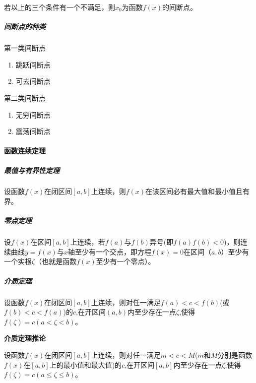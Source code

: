 \documentclass[
]{article}
\begin{document}
若以上的三个条件有一个不满足，则\(x_0\)为函数\(f(x)\)的间断点。

\hypertarget{ux95f4ux65adux70b9ux7684ux79cdux7c7b}{%
\subparagraph{间断点的种类}\label{ux95f4ux65adux70b9ux7684ux79cdux7c7b}}

第一类间断点

\begin{enumerate}
\def\labelenumi{\arabic{enumi}.}
\item
  跳跃间断点
\item
  可去间断点
\end{enumerate}

第二类间断点

\begin{enumerate}
\def\labelenumi{\arabic{enumi}.}
\item
  无穷间断点
\item
  震荡间断点
\end{enumerate}

\hypertarget{ux51fdux6570ux8fdeux7eedux5b9aux7406}{%
\paragraph{函数连续定理}\label{ux51fdux6570ux8fdeux7eedux5b9aux7406}}

\hypertarget{ux6700ux503cux4e0eux6709ux754cux6027ux5b9aux7406}{%
\subparagraph{最值与有界性定理}\label{ux6700ux503cux4e0eux6709ux754cux6027ux5b9aux7406}}

设函数\(f(x)\)在闭区间\([a,b]\)上连续，则\(f(x)\)在该区间必有最大值和最小值且有界。

\hypertarget{ux96f6ux70b9ux5b9aux7406}{%
\subparagraph{零点定理}\label{ux96f6ux70b9ux5b9aux7406}}

设\(f(x)\)在区间\([a,b]\)上连续，若\(f(a)\)与\(f(b)\)异号(即\(f(a)f(b)<0\))，则连续曲线\(y=f(x)\)与\(x\)轴至少有一个交点，即方程\(f(x) = 0\)在区间\(（a,b）\)至少有一个实根\(\zeta\)（也就是函数\(f(x)\)至少有一个零点）。

\hypertarget{ux4ecbux8d28ux5b9aux7406}{%
\subparagraph{介质定理}\label{ux4ecbux8d28ux5b9aux7406}}

设函数\(f(x)\)在闭区间\([a,b]\)上连续，则对任一满足\(f(a)<c<f(b)\)(或\(f(b)<c<f(a)\))的\(c\),在开区间\((a,b)\)内至少存在一点\(\zeta\),使得\(f(\zeta) = c(a<\zeta<b)\)。

\textbf{介质定理推论}

设函数\(f(x)\)在闭区间\([a,b]\)上连续，则对任一满足\(m<c<M\)(\(m\)和\(M\)分别是函数\(f(x)\)在\([a,b]\)上的最小值和最大值)的\(c\),在开区间\([a,b]\)内至少存在一点\(\zeta\),使得\(f(\zeta) = c(a\le\zeta\le b)\)。
\end{document}
